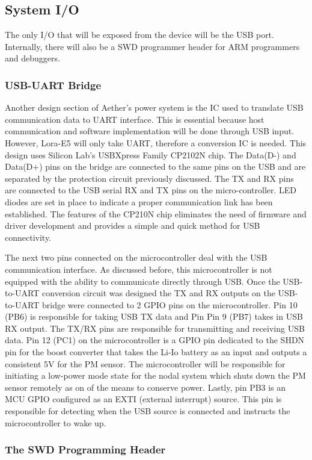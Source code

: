 \subsection{System I/O} \label{sec:sys-io}
The only I/O that will be exposed from the device will be the USB port. Internally, there will also
be a SWD programmer header for ARM programmers and debuggers.

\subsubsection{USB-UART Bridge}
Another design section of Aether's power system is the IC used to translate USB communication data
to UART interface. This is essential because host communication and software implementation will be
done through USB input. However, Lora-E5 will only take UART, therefore a conversion IC is needed.
This design uses Silicon Lab's USBXpress Family CP2102N chip. The Data(D-) and Data(D+) pins on the
bridge are connected to the same pins on the USB and are separated by the protection circuit
previously discussed. The TX and RX pins are connected to the USB serial RX and TX pins on the
micro-controller. LED diodes are set in place to indicate a proper communication link has been
established. The features of the CP210N chip eliminates the need of firmware and driver development
and provides a simple and quick method for USB connectivity.

The next two pins connected on the microcontroller deal with the USB communication interface. As
discussed before, this microcontroller is not equipped with the ability to communicate directly
through USB. Once the USB-to-UART conversion circuit was designed the TX and RX outputs on the
USB-to-UART bridge were connected to 2 GPIO pins on the microcontroller. Pin 10 (PB6) is responsible
for taking USB TX data and Pin Pin 9 (PB7) takes in USB RX output. The TX/RX pins are responsible
for transmitting and receiving USB data. Pin 12 (PC1) on the microcontroller is a GPIO pin dedicated
to the SHDN pin for the boost converter that takes the Li-Io battery as an input and outputs
a consistent 5V for the PM sensor. The microcontroller will be responsible for initiating
a low-power mode state for the nodal system which shuts down the PM sensor remotely as on of the
means to conserve power. Lastly, pin PB3 is an MCU GPIO configured as an EXTI (external interrupt)
source. This pin is responsible for detecting when the USB source is connected and instructs the
microcontroller to wake up. 

\subsubsection{The SWD Programming Header}

